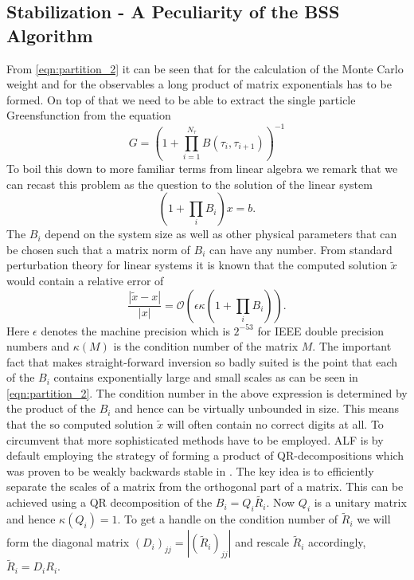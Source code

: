 \subsection{Stabilization - A Peculiarity of the BSS Algorithm}\label{sec:stable}
From \eqref{eqn:partition_2} it can be seen that for the calculation of the Monte Carlo weight
and for the observables a long product of matrix exponentials has to be formed.
On top of that we need to be able to extract the single particle Greensfunction from 
the equation 
\begin{equation}
G = \left( 1 + \prod_{i = 1}^{N_\tau} B(\tau_i, \tau_{i+1})\right)^{-1}
\end{equation}
To boil this down to more familiar terms from linear algebra we remark that we can recast this problem as the question to the solution of the linear system
\begin{equation}
(1 + \prod_i B_i) x = b.
\end{equation}
The $B_i$ depend on the system size as well as other physical parameters that can be chosen such that a matrix norm of $B_i$ can have any number.
From standard perturbation theory for linear systems it is known that the computed solution $\tilde{x}$ would 
contain a relative error of
\begin{equation}
\frac{|\tilde{x} - x|}{|x|} = \mathcal{O}\left(\epsilon \kappa(1 + \prod_i B_i)\right).
\end{equation}
Here $\epsilon$ denotes the machine precision which is $2^{-53}$ for IEEE double precision numbers
and $\kappa(M)$ is the condition number of the matrix $M$.
The important fact that makes straight-forward inversion so badly suited is the point that
each of the $B_i$ contains exponentially large and small scales as can be seen in \eqref{eqn:partition_2}.
The condition number in the above expression is determined by the product of the $B_i$
and hence can be virtually unbounded in size. This means that the so computed solution $\tilde{x}$
will often contain no correct digits at all.
To circumvent that more sophisticated methods have to be employed. ALF is by default employing
the strategy of forming a product of QR-decompositions which was proven to be weakly backwards stable in \cite{Bai2011}.
The key idea is to efficiently separate the scales of a matrix from the orthogonal part of a matrix.
This can be achieved using a QR decomposition of the $B_i = Q_i \tilde{R_i}$. Now $Q_i$ is a unitary matrix and hence $\kappa(Q_i) = 1$.
To get a handle on the condition number of $\tilde{R}_i$ we will form the
diagonal matrix $(D_i)_{jj} = |(\tilde{R}_i)_{jj}|$ and rescale $\tilde{R}_i$ accordingly, $\tilde{R}_i = D_i R_i$.

